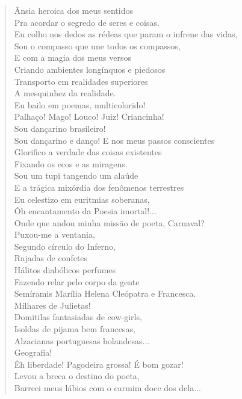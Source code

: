 \begin{verse}
Ânsia heroica dos meus sentidos\\
Pra acordar o segredo de seres e coisas.\\
Eu colho nos dedos as rédeas que param o infrene das vidas,\\
Sou o compasso que une todos os compassos,\\
E com a magia dos meus versos\\
Criando ambientes longínquos e piedosos\\
Transporto em realidades superiores\\
A mesquinhez da realidade.\\
Eu bailo em poemas, multicolorido!\\
Palhaço! Mago! Louco! Juiz! Criancinha!\\
Sou dançarino brasileiro!\\
Sou dançarino e danço! E nos meus passos conscientes\\
Glorifico a verdade das coisas existentes\\
Fixando os ecos e as miragens.\\
Sou um tupi tangendo um alaúde\\
E a trágica mixórdia dos fenômenos terrestres\\
Eu celestizo em euritmias soberanas,\\
Ôh encantamento da Poesia imortal!...\\
Onde que andou minha missão de poeta, Carnaval?\\
Puxou-me a ventania,\\
Segundo círculo do Inferno,\\
Rajadas de confetes\\
Hálitos diabólicos perfumes\\
Fazendo relar pelo corpo da gente\\
Semíramis Marília Helena Cleópatra e Francesca.\\
Milhares de Julietas!\\
Domitilas fantasiadas de cow-girls,\\
Isoldas de pijama bem francesas,\\
Alzacianas portuguesas holandesas...\\
\quad\quad\quad\quad\quad{}Geografia!\\
Êh liberdade! Pagodeira grossa! É bom gozar!\\
Levou a breca o destino do poeta,\\
Barreei meus lábios com o carmim doce dos dela...


\end{verse}

